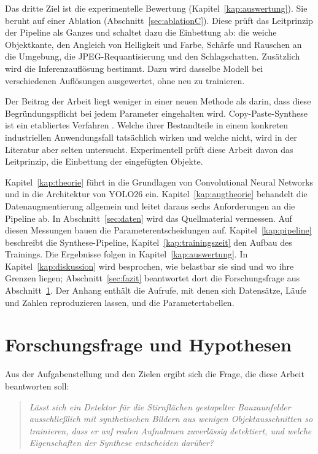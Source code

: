 Das dritte Ziel ist die experimentelle Bewertung (Kapitel~\ref{kap:auswertung}).
Sie beruht auf einer Ablation (Abschnitt~\ref{sec:ablationC}). Diese prüft das
Leitprinzip der Pipeline als Ganzes und schaltet dazu die Einbettung ab: die
weiche Objektkante, den Angleich von Helligkeit und Farbe, Schärfe und Rauschen
an die Umgebung, die JPEG-Requantisierung und den Schlagschatten. Zusätzlich wird die Inferenzauflösung bestimmt. Dazu wird
dasselbe Modell bei verschiedenen Auflösungen ausgewertet, ohne neu zu
trainieren.

Der Beitrag der Arbeit liegt weniger in einer neuen Methode als darin, dass
diese Begründungspflicht bei jedem Parameter eingehalten wird.
Copy-Paste-Synthese ist ein etabliertes Verfahren
\parencite{dwibedi2017,dvornik2018,ghiasi2021}. Welche ihrer Bestandteile in
einem konkreten industriellen Anwendungsfall tatsächlich wirken und welche
nicht, wird in der Literatur aber selten untersucht. Experimentell prüft diese
Arbeit davon das Leitprinzip, die Einbettung der eingefügten Objekte.

 Kapitel~\ref{kap:theorie} führt in die Grundlagen
von Convolutional Neural Networks und in die Architektur von YOLO26 ein.
Kapitel~\ref{kap:augtheorie} behandelt die Datenaugmentierung allgemein und
leitet daraus sechs Anforderungen an die Pipeline ab. In
Abschnitt~\ref{sec:daten} wird das Quellmaterial vermessen. Auf diesen
Messungen bauen die Parameterentscheidungen auf. Kapitel~\ref{kap:pipeline}
beschreibt die Synthese-Pipeline, Kapitel~\ref{kap:trainingszeit} den Aufbau
des Trainings. Die Ergebnisse folgen in Kapitel~\ref{kap:auswertung}. In
Kapitel~\ref{kap:diskussion} wird besprochen, wie belastbar sie sind und wo
ihre Grenzen liegen; Abschnitt~\ref{sec:fazit} beantwortet dort die
Forschungsfrage aus Abschnitt~\ref{sec:forschungsfrage}. Der Anhang enthält
die Aufrufe, mit denen sich Datensätze, Läufe und Zahlen reproduzieren lassen,
und die Parametertabellen.

\section{Forschungsfrage und Hypothesen}
\label{sec:forschungsfrage}

Aus der Aufgabenstellung und den Zielen ergibt sich die Frage, die diese
Arbeit beantworten soll:

\begin{quote}
\emph{Lässt sich ein Detektor für die Stirnflächen gestapelter Bauzaunfelder
ausschließlich mit synthetischen Bildern aus wenigen Objektausschnitten so
trainieren, dass er auf realen Aufnahmen zuverlässig detektiert, und welche
Eigenschaften der Synthese entscheiden darüber?}
\end{quote}

